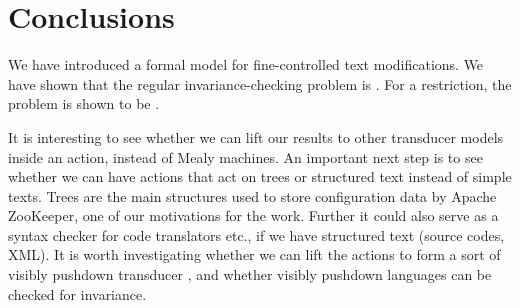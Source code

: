 
\section{Conclusions}\label{sec:conclusion}

We have introduced a formal model for fine-controlled text modifications. We have shown that the regular invariance-checking problem is \pspc. For a restriction, the problem is shown to be \conpc.

It is interesting to see whether we can lift our results to other transducer models inside an action, instead of Mealy machines. An important next step is to see whether we can have actions that act on trees or structured text instead of simple texts. Trees are the main structures used to store configuration data by Apache ZooKeeper, one of our motivations for the work. Further it could also serve as a syntax checker for code translators etc., if we have structured text (source codes, XML). It is worth investigating whether we can lift the actions to form a sort of  visibly pushdown transducer \cite{FRRST2018}, and whether visibly pushdown languages \cite{AM2004} can be checked for invariance.
